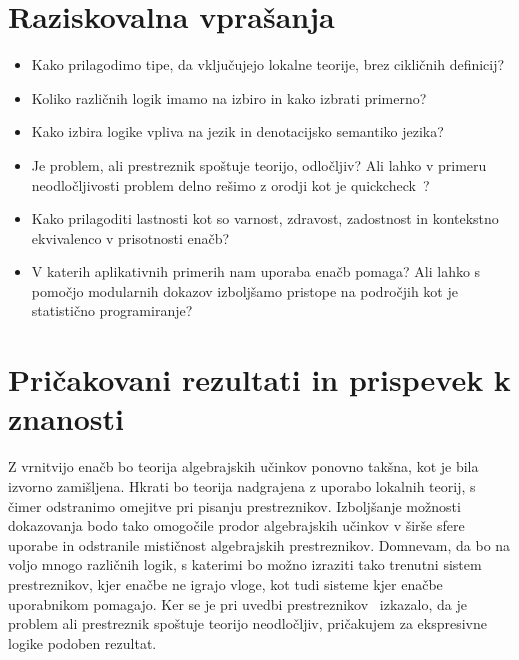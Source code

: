 \documentclass{article}
\begin{document}
\section*{Raziskovalna vprašanja}

\begin{itemize}
  \item Kako prilagodimo tipe, da vključujejo lokalne teorije, brez cikličnih definicij?
  \item Koliko različnih logik imamo na izbiro in kako izbrati primerno?
  \item Kako izbira logike vpliva na jezik in denotacijsko semantiko jezika?
  \item Je problem, ali prestreznik spoštuje teorijo, odločljiv? Ali lahko v primeru neodločljivosti problem delno rešimo z orodji kot je quickcheck~\cite{DBLP:conf/icfp/ClaessenH00}?
  \item Kako prilagoditi lastnosti kot so varnost, zdravost, zadostnost in kontekstno ekvivalenco v prisotnosti enačb?
  \item V katerih aplikativnih primerih nam uporaba enačb pomaga? Ali lahko s pomočjo modularnih dokazov izboljšamo pristope na področjih kot je statistično programiranje?
\end{itemize}


\section*{Pričakovani rezultati in prispevek k znanosti}

Z vrnitvijo enačb  bo teorija algebrajskih učinkov ponovno takšna, kot je bila izvorno zamišljena. Hkrati bo teorija nadgrajena z uporabo lokalnih teorij, s čimer odstranimo omejitve pri pisanju prestreznikov. Izboljšanje možnosti dokazovanja bodo tako omogočile prodor algebrajskih učinkov v širše sfere uporabe in odstranile mističnost algebrajskih prestreznikov. Domnevam, da bo na voljo mnogo različnih logik, s katerimi bo možno izraziti tako trenutni sistem prestreznikov, kjer enačbe ne igrajo vloge, kot tudi sisteme kjer enačbe uporabnikom pomagajo. Ker se je pri uvedbi prestreznikov~\cite{DBLP:conf/esop/PlotkinP09} izkazalo, da je problem ali prestreznik spoštuje teorijo neodločljiv, pričakujem za ekspresivne logike podoben rezultat.


\renewcommand\refname{Literatura}


\end{document}
